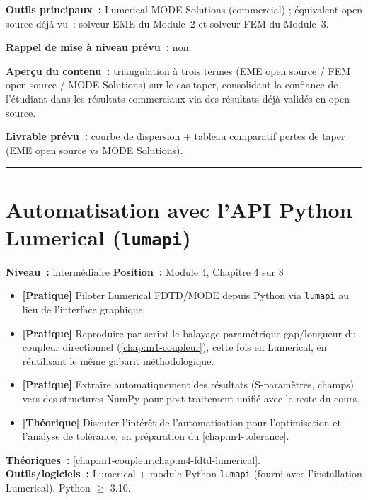 \noindent\textbf{Outils principaux~:} Lumerical MODE Solutions (commercial) ; équivalent open source déjà vu~: solveur EME du Module~2 et solveur FEM du Module~3.

\noindent\textbf{Rappel de mise à niveau prévu~:} non.

\noindent\textbf{Aperçu du contenu~:} triangulation à trois termes (EME open source / FEM open source / MODE Solutions) sur le cas taper, consolidant la confiance de l'étudiant dans les résultats commerciaux via des résultats déjà validés en open source.

\noindent\textbf{Livrable prévu~:} courbe de dispersion + tableau comparatif pertes de taper (EME open source vs MODE Solutions).

\bigskip\hrule\bigskip

\chapter{Automatisation avec l'API Python Lumerical (\texttt{lumapi})}
\label{chap:m4-api}

\noindent\textbf{Niveau~:} intermédiaire \hfill \textbf{Position~:} Module 4, Chapitre 4 sur 8

\begin{objectifs}
\begin{itemize}[leftmargin=1.4em]
  \item \textbf{[Pratique]} Piloter Lumerical FDTD/MODE depuis Python via \texttt{lumapi} au lieu de l'interface graphique.
  \item \textbf{[Pratique]} Reproduire par script le balayage paramétrique gap/longueur du coupleur directionnel (\cref{chap:m1-coupleur}), cette fois en Lumerical, en réutilisant le même gabarit méthodologique.
  \item \textbf{[Pratique]} Extraire automatiquement des résultats (S-paramètres, champs) vers des structures NumPy pour post-traitement unifié avec le reste du cours.
  \item \textbf{[Théorique]} Discuter l'intérêt de l'automatisation pour l'optimisation et l'analyse de tolérance, en préparation du \cref{chap:m4-tolerance}.
\end{itemize}
\end{objectifs}

\begin{prerequis}
\textbf{Théoriques~:} \cref{chap:m1-coupleur,chap:m4-fdtd-lumerical}.\\
\textbf{Outils/logiciels~:} Lumerical + module Python \texttt{lumapi} (fourni avec l'installation Lumerical), Python $\geq$ 3.10.
\end{prerequis}

